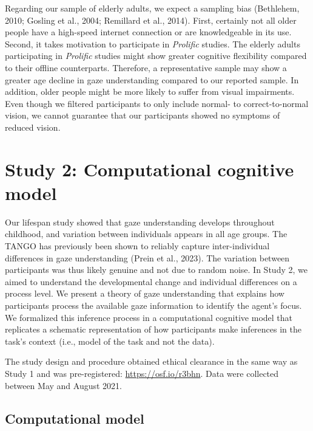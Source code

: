 \documentclass[
  man,mask,floatsintext]{apa7}
\begin{document}
Regarding our sample of elderly adults, we expect a sampling bias (Bethlehem, 2010; Gosling et al., 2004; Remillard et al., 2014). First, certainly not all older people have a high-speed internet connection or are knowledgeable in its use. Second, it takes motivation to participate in \emph{Prolific} studies. The elderly adults participating in \emph{Prolific} studies might show greater cognitive flexibility compared to their offline counterparts. Therefore, a representative sample may show a greater age decline in gaze understanding compared to our reported sample. In addition, older people might be more likely to suffer from visual impairments. Even though we filtered participants to only include normal- to correct-to-normal vision, we cannot guarantee that our participants showed no symptoms of reduced vision.

\hypertarget{study-2-computational-cognitive-model}{%
\section{Study 2: Computational cognitive model}\label{study-2-computational-cognitive-model}}

Our lifespan study showed that gaze understanding develops throughout childhood, and variation between individuals appears in all age groups. The TANGO has previously been shown to reliably capture inter-individual differences in gaze understanding (Prein et al., 2023). The variation between participants was thus likely genuine and not due to random noise. In Study 2, we aimed to understand the developmental change and individual differences on a process level. We present a theory of gaze understanding that explains how participants process the available gaze information to identify the agent's focus. We formalized this inference process in a computational cognitive model that replicates a schematic representation of how participants make inferences in the task's context (i.e., model of the task and not the data).

The study design and procedure obtained ethical clearance in the same way as Study 1 and was pre-registered: \url{https://osf.io/r3bhn}. Data were collected between May and August 2021.

\hypertarget{computational-model}{%
\subsection{Computational model}\label{computational-model}}
\end{document}
